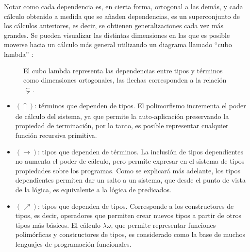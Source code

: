 Notar como cada dependencia es, en cierta forma, ortogonal a las demás, y cada cálculo obtenido a medida que se añaden dependencias, es un superconjunto de los cálculos anteriores, es decir, se obtienen generalizaciones cada vez más grandes.
Se pueden visualizar las distintas dimensiones en las que es posible moverse hacia un cálculo más general utilizando un diagrama llamado ``cubo lambda'' \cite{lambda_cube}:

\begin{figure}[H]
	\centering
	\caption{El cubo lambda representa las dependencias entre tipos y términos como dimensiones ortogonales, las flechas corresponden a la relación $\subsetneq$.}
\end{figure}

\begin{itemize}
	\item $(\uparrow)$: términos que dependen de tipos.
	El polimorfismo incrementa el poder de cálculo del sistema, ya que permite la auto-aplicación preservando la propiedad de terminación, por lo tanto, es posible representar cualquier función recursiva primitiva.
	\item $(\rightarrow)$: tipos que dependen de términos.
	La inclusión de tipos dependientes no aumenta el poder de cálculo, pero permite expresar en el sistema de tipos propiedades sobre los programas.
	Como se explicará más adelante, los tipos dependientes permiten dar un salto a un sistema, que desde el punto de vista de la lógica, es equivalente a la lógica de predicados.
	\item $(\nearrow)$: tipos que dependen de tipos.
	Corresponde a los constructores de tipos, es decir, operadores que permiten crear nuevos tipos a partir de otros tipos más básicos.
	El cálculo $\lambda\omega$, que permite representar funciones polimórficas y constructores de tipos, es considerado como la base de muchos lenguajes de programación funcionales.
\end{itemize}

